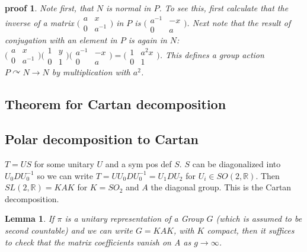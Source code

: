 \documentclass[
  12pt
]{article}
\theoremstyle{break}
\theoremstyle{plain}
\newtheorem{lem}[thm]{Lemma}
\newtheorem*{pf}{proof}
\newcommand{\ipmatrix}[1]{%
\ensuremath{\big(\begin{smallmatrix} #1 \end{smallmatrix}\big)}}
\begin{document}
\begin{pf}
    Note first, that $N$ is normal in $P$. To see this, first calculate that the
    inverse of a matrix $\ipmatrix{ a & x \\ 0 & a^{-1} }$ in $P$ is $\ipmatrix{
    a^{-1} & -x \\ 0 & a }$. Next note that the result of conjugation with an
    element in $P$ is again in $N$: $\ipmatrix{ a & x \\ 0 & a^{-1} } \ipmatrix{1 &
    y \\ 0 & 1} \ipmatrix{ a^{-1} & -x \\ 0 & a } = \ipmatrix{1 & a^2x \\ 0 & 1}$.
    This defines a group action $P \curvearrowright N \rightarrow N$ by
    multiplication with $a^2$.
  \end{pf}



  \hypertarget{theorem-for-cartan-decomposition}{%
  \subsection{Theorem for Cartan
  decomposition}\label{theorem-for-cartan-decomposition}}

  \hypertarget{polar-decomposition-to-cartan}{%
  \subsection{Polar decomposition to Cartan}
  \label{polar-decomposition-to-cartan}}

  $T = US$ for some unitary $U$ and a sym pos def $S$. $S$ can be
  diagonalized into $U_0 D U_0^{-1}$ so we can write
  $T = U U_0 D U_0^{-1} = U_1 D U_2$ for $U_i \in SO(2, \mathbb{R})$.
  Then $SL(2, \mathbb{R}) = KAK$ for $K = SO_2$ and $A$ the diagonal
  group. This is the Cartan decomposition.





  \begin{lem}
    \label{lemma}
    If $\pi$ is a unitary representation of a Group $G$ (which is assumed to be second countable) and we can write $G =
    KAK$, with $K$ compact, then it suffices to check that the matrix
    coefficients vanish on A as $g \rightarrow \infty$.
  \end{lem}
\end{document}
